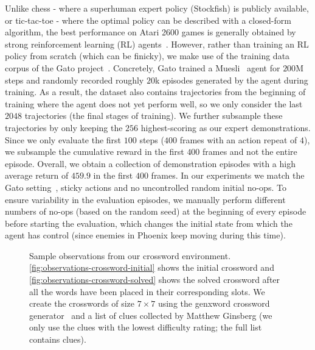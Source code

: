 Unlike chess - where a superhuman expert policy (\ie Stockfish) is publicly available, or tic-tac-toe - where the optimal policy can be described with a closed-form algorithm, the best performance on Atari 2600 games is generally obtained by strong reinforcement learning (RL) agents~\citep{mnih2013playing, hessel2021muesli}.
However, rather than training an RL policy from scratch (which can be finicky), we make use of the training data corpus of the Gato project~\citep{reed2022generalist}.
Concretely, Gato trained a Muesli~\citep{hessel2021muesli} agent for $200$M steps and randomly recorded roughly $20$k episodes generated by the agent during training.
As a result, the dataset also contains trajectories from the beginning of training where the agent does not yet perform well, so we only consider the last $2048$ trajectories (\ie the final stages of training).
We further subsample these trajectories by only keeping the $256$ highest-scoring as our expert demonstrations.
Since we only evaluate the first $100$ steps (\ie $400$ frames with an action repeat of $4$), we subsample \wrt the cumulative reward in the first $400$ frames and not \wrt the entire episode.
Overall, we obtain a collection of demonstration episodes with a high average return of $459.9$ in the first $400$ frames. In our experiments we match the Gato setting~\citep{reed2022generalist}, \ie sticky actions and no uncontrolled random initial no-ops. To ensure variability in the evaluation episodes, we manually perform different numbers of no-ops (based on the random seed) at the beginning of every episode before starting the evaluation, which changes the initial state from which the agent has control (since enemies in Phoenix keep moving during this time).



\begin{figure}[t]
    \begin{center}
        \hspace{64pt}
    \end{center}
   \caption{
        Sample observations from our crossword environment.
        \cref{fig:observations-crossword-initial} shows the initial crossword and \cref{fig:observations-crossword-solved} shows the solved crossword after all the words have been placed in their corresponding slots.
        We create the crosswords of size $7\times7$ using the genxword crossword generator~\citep{whitlock2011genxword} and a list of  clues collected by Matthew Ginsberg (we only use the clues with the lowest difficulty rating; the full list contains  clues).
   }
   \label{fig:observations-crossword}
\end{figure}

